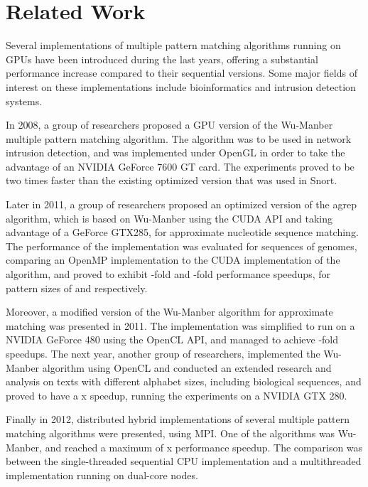 \documentclass{ws-ijait}
\begin{document}
\section{Related Work}
\label{sec:related-work}

Several implementations of multiple pattern matching algorithms running on GPUs have been introduced during the last years, offering a substantial performance increase compared to their sequential versions. Some major fields of interest on these implementations include bioinformatics and intrusion detection systems.

In 2008, a group of researchers proposed a GPU version of the Wu-Manber multiple pattern matching algorithm.\cite{Huang2008} The algorithm was to be used in network intrusion detection, and was implemented under OpenGL in order to take the advantage of an NVIDIA GeForce 7600 GT card. The experiments proved to be two times faster than the existing optimized version that was used in Snort.\cite{SnortWeb}

Later in 2011,\cite{Hongjian2011} a group of researchers proposed an optimized version of the agrep algorithm,\cite{Wu1992} which is based on Wu-Manber using the CUDA API and taking advantage of a GeForce GTX285, for approximate nucleotide sequence matching. The performance of the implementation was evaluated for sequences of genomes, comparing an OpenMP implementation to the CUDA implementation of the algorithm, and proved to exhibit -fold and -fold performance speedups, for pattern sizes of  and  respectively.

Moreover, a modified version of the Wu-Manber algorithm for approximate matching was presented in 2011.\cite{tran2011} The implementation was simplified to run on a NVIDIA GeForce 480 using the OpenCL API, and managed to achieve -fold speedups. The next year, another group of researchers,\cite{pyrgiotis2012parallel} implemented the Wu-Manber algorithm using OpenCL and conducted an extended research and analysis on texts with different alphabet sizes, including biological sequences, and proved to have a x speedup, running the experiments on a NVIDIA GTX 280.

Finally in 2012, distributed hybrid implementations of several multiple pattern matching algorithms were presented,\cite{Kouzinopoulos2012} using MPI. One of the algorithms was Wu-Manber, and reached a maximum of x performance speedup. The comparison was between the single-threaded sequential CPU implementation and a multithreaded implementation running on  dual-core nodes.
\end{document}
